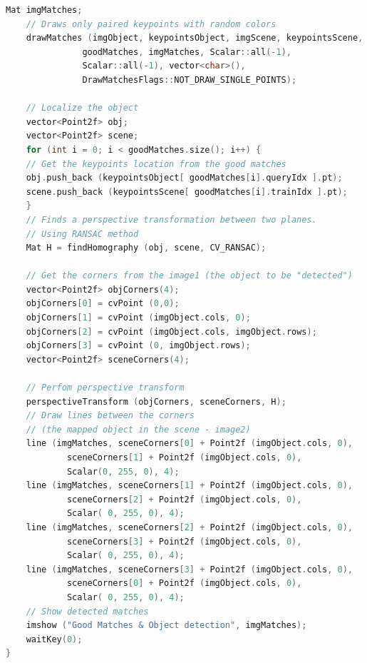 \begin{lstlisting}[language=C,caption={Detekcija objekta na drugoj
    slici}]
    Mat imgMatches;
    // Draws only paired keypoints with random colors
    drawMatches (imgObject, keypointsObject, imgScene, keypointsScene,
               goodMatches, imgMatches, Scalar::all(-1), 
               Scalar::all(-1), vector<char>(), 
               DrawMatchesFlags::NOT_DRAW_SINGLE_POINTS);

    // Localize the object
    vector<Point2f> obj;
    vector<Point2f> scene;
    for (int i = 0; i < goodMatches.size(); i++) {
    // Get the keypoints location from the good matches
    obj.push_back (keypointsObject[ goodMatches[i].queryIdx ].pt);
    scene.push_back (keypointsScene[ goodMatches[i].trainIdx ].pt);
    }
    // Finds a perspective transformation between two planes.
    // Using RANSAC method
    Mat H = findHomography (obj, scene, CV_RANSAC);

    // Get the corners from the image1 (the object to be "detected")
    vector<Point2f> objCorners(4);
    objCorners[0] = cvPoint (0,0); 
    objCorners[1] = cvPoint (imgObject.cols, 0);
    objCorners[2] = cvPoint (imgObject.cols, imgObject.rows); 
    objCorners[3] = cvPoint (0, imgObject.rows);
    vector<Point2f> sceneCorners(4);

    // Perfom perspective transform 
    perspectiveTransform (objCorners, sceneCorners, H);
    // Draw lines between the corners 
    // (the mapped object in the scene - image2)
    line (imgMatches, sceneCorners[0] + Point2f (imgObject.cols, 0), 
            sceneCorners[1] + Point2f (imgObject.cols, 0), 
            Scalar(0, 255, 0), 4);
    line (imgMatches, sceneCorners[1] + Point2f (imgObject.cols, 0), 
            sceneCorners[2] + Point2f (imgObject.cols, 0), 
            Scalar( 0, 255, 0), 4);
    line (imgMatches, sceneCorners[2] + Point2f (imgObject.cols, 0), 
            sceneCorners[3] + Point2f (imgObject.cols, 0), 
            Scalar( 0, 255, 0), 4);
    line (imgMatches, sceneCorners[3] + Point2f (imgObject.cols, 0), 
            sceneCorners[0] + Point2f (imgObject.cols, 0), 
            Scalar( 0, 255, 0), 4);
    // Show detected matches
    imshow ("Good Matches & Object detection", imgMatches);
    waitKey(0);
}
\end{lstlisting}

